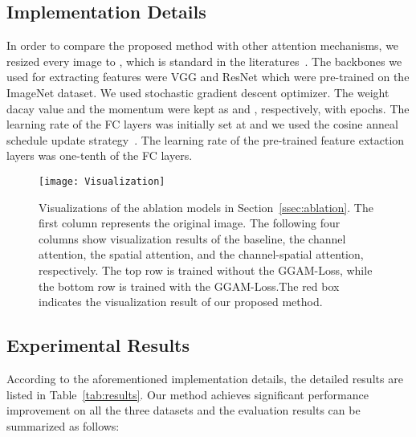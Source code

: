 \documentclass{article}
\begin{document}
\subsection{Implementation Details}
\vspace{-0.35em}
In order to compare the proposed method with other attention mechanisms, we resized every image to , which is standard in the literatures~\cite{DCL,ACNet}. The backbones we used for extracting features were VGG and ResNet which were pre-trained on the ImageNet dataset. We used stochastic gradient descent optimizer. The weight dacay value and the momentum were kept as  and , respectively, with  epochs. The learning rate of the FC layers was initially set at  and we used the cosine anneal schedule update strategy~\cite{cos}. The learning rate of the pre-trained feature extaction layers was one-tenth of the FC layers. 
\begin{figure*}[!t]
    \centering 
    \texttt{[image: Visualization]}  
    \vspace{-6mm}
    \caption{Visualizations of the ablation models in Section~\ref{ssec:ablation}. The first column represents  the original image. The following four columns show visualization results of the baseline, the channel attention, the spatial attention, and the channel-spatial attention, respectively. The top row is trained without the GGAM-Loss, while the bottom row is trained with the GGAM-Loss.The red box indicates the visualization result of our proposed method.}\label{fig:visual}
\end{figure*}
\vspace{-1mm} 
\subsection{Experimental Results}

According to the aforementioned implementation details, the detailed results are listed in Table~\ref{tab:results}. Our method achieves significant performance improvement on all the three datasets and the evaluation results can be summarized as follows:
\end{document}
